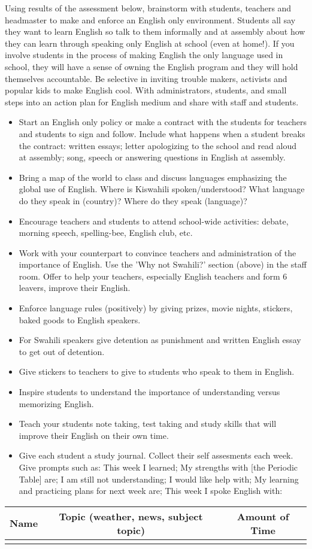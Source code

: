 Using results of the assessment below, brainstorm with students, teachers
and headmaster to make and enforce an English only environment. Students
all say they want to learn English so talk to them informally and
at assembly about how they can learn through speaking only English
at school (even at home!). If you involve students in the process
of making English the only language used in school, they will have
a sense of owning the English program and they will hold themselves
accountable. Be selective in inviting trouble makers, activists and
popular kids to make English cool. With administrators, students,
and small steps into an action plan for English medium and share with
staff and students.
\begin{itemize}
\item Start an English only policy or make a contract with the students
for teachers and students to sign and follow. Include what happens
when a student breaks the contract: written essays; letter apologizing
to the school and read aloud at assembly; song, speech or answering
questions in English at assembly.
\item Bring a map of the world to class and discuss languages emphasizing
the global use of English. Where is Kiswahili spoken/understood? What
language do they speak in (country)? Where do they speak (language)? 
\item Encourage teachers and students to attend school-wide activities:
debate, morning speech, spelling-bee, English club, etc.
\item Work with your counterpart to convince teachers and administration
of the importance of English. Use the 'Why not Swahili?' section (above)
in the staff room. Offer to help your teachers, especially English
teachers and form 6 leavers, improve their English.
\item Enforce language rules (positively) by giving prizes, movie nights,
stickers, baked goods to English speakers.
\item For Swahili speakers give detention as punishment and written English
essay to get out of detention. 
\item Give stickers to teachers to give to students who speak to them in
English. 
\item Inspire students to understand the importance of understanding versus
memorizing English. 
\item Teach your students note taking, test taking and study skills that
will improve their English on their own time.
\item Give each student a study journal. Collect their self assesments each
week. Give prompts such as: This week I learned; My strengths with
{[}the Periodic Table{]} are; I am still not understanding; I would
like help with; My learning and practicing plans for next week are;
This week I spoke English with:
\end{itemize}
\begin{center}
\begin{tabular}{|c|c|c|}
\hline 
Name & Topic (weather, news, subject topic) & Amount of Time\tabularnewline
\hline 
\hline 
 &  & \tabularnewline
\hline 
\end{tabular}
\end{center}



